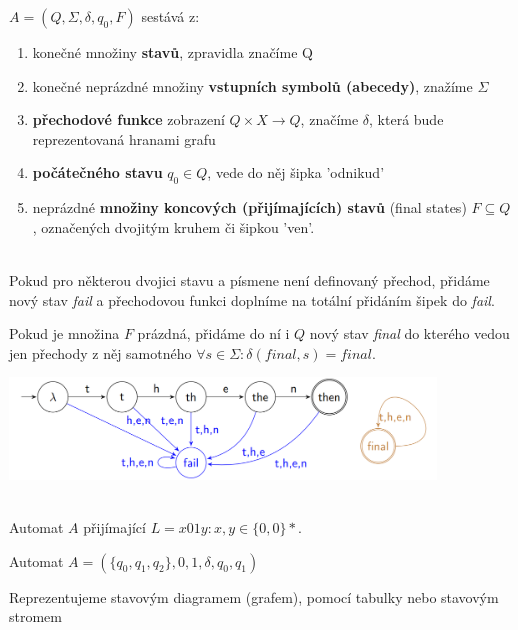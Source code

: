 \documentclass[../main.tex]{subfiles}
\begin{document}
\begin{definition}
    $A = (Q, \Sigma,\delta, q_0, F)$ sestává z:
    \begin{enumerate}
    \item  konečné množiny \textbf{stavů}, zpravidla značíme Q
    \item konečné neprázdné množiny \textbf{vstupních symbolů (abecedy)}, znažíme $\Sigma$
    \item \textbf{přechodové funkce} zobrazení $Q \times X \rightarrow Q$, značíme $\delta$, která bude reprezentovaná hranami grafu
    \item \textbf{počátečného stavu} $q_0 \in Q$, vede do něj šipka 'odnikud'
    \item neprázdné \textbf{množiny koncových (přijímajících) stavů} (final states) $F \subseteq Q$, označených dvojitým kruhem či šipkou 'ven'.
    \end{enumerate}
\end{definition}
\begin{remark}
    $ $\\
    Pokud pro některou dvojici stavu a písmene není definovaný přechod, přidáme nový stav \textit{fail}
    a přechodovou funkci doplníme na totální přidáním šipek do \textit{fail}.

    \vspace{3mm}
    \noindent
    Pokud je množina $F$ prázdná, přidáme do ní i $Q$ nový stav \textit{final} do kterého vedou jen přechody
    z něj samotného $\forall s \in \Sigma : \delta (final,s) = final$.
\end{remark}
\begin{center}
\includegraphics[width=0.85\textwidth]{01-automat.png}
\end{center}

\begin{example}
    $ $\\
    Automat $A$ přijímající $L = {x01y : x, y \in \{0,0\}*}$.

    \vspace{3mm}
    \noindent
    Automat $A = (\{q_0,q_1,q_2\}, {0,1}, \delta, q_0, {q_1})$

    \vspace{3mm}
    \noindent
    Reprezentujeme stavovým diagramem (grafem), pomocí tabulky nebo stavovým stromem
\end{example}
\end{document}
